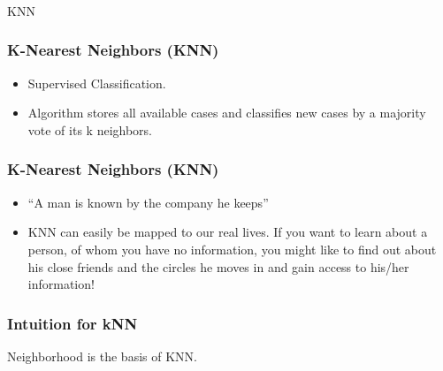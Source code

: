\begin{frame}[fragile]\frametitle{}
\begin{center}
{\Large KNN}
\end{center}
\end{frame}

\begin{frame}[fragile]\frametitle{K-Nearest Neighbors (KNN)}
\begin{itemize}
\item Supervised Classification.
\item Algorithm stores all available cases and classifies new cases by a majority vote of its k neighbors. 
\end{itemize}
\end{frame}

\begin{frame}[fragile]\frametitle{K-Nearest Neighbors (KNN)}
\begin{itemize}
\item ``A man is known by the company he keeps''
\item KNN can easily be mapped to our real lives. If you want to learn about a person, of whom you have no information, you might like to find out about his close friends and the circles he moves in and gain access to his/her information!
\end{itemize}
\end{frame}

\begin{frame}[fragile]\frametitle{Intuition for kNN}
\hfill
{}
Neighborhood is the basis of KNN.
\end{frame}


